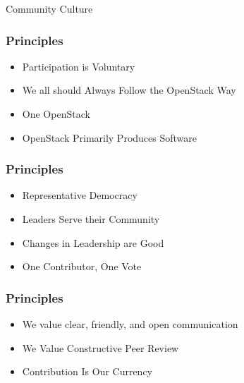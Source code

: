 \documentclass[aspectratio=169,11pt,hyperref={colorlinks=true}]{beamer}
\begin{document}
\begin{frame}[c]
  \begin{center}
      \color{white}
      \Huge Community Culture
  \end{center}
\end{frame}


\begin{frame}
  \frametitle{Principles}
    \begin{itemize}
        \item{Participation is Voluntary}
        \item{We all should Always Follow the OpenStack Way}
        \item{One OpenStack}
        \item{OpenStack Primarily Produces Software}
    \end{itemize}
\end{frame}

\begin{frame}
  \frametitle{Principles}
    \begin{itemize}
        \item{Representative Democracy}
        \item{Leaders Serve their Community}
        \item{Changes in Leadership are Good}
        \item{One Contributor, One Vote}
    \end{itemize}
\end{frame}

\begin{frame}
  \frametitle{Principles}
    \begin{itemize}
        \item{We value clear, friendly, and open communication}
        \item{We Value Constructive Peer Review}
        \item{Contribution Is Our Currency}
    \end{itemize}
\end{frame}
\end{document}

